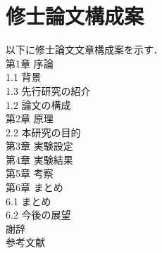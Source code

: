 \documentclass[11pt,a4paper]{jarticle}
\begin{document}
\section{修士論文構成案}
以下に修士論文文章構成案を示す．\\
\noindent
第1章 序論\\
\hspace{0.5cm}1.1 背景\\
\hspace{0.5cm}1.3 先行研究の紹介\\
\hspace{0.5cm}1.2 論文の構成\\
第2章 原理\\
\hspace{0.5cm}2.2 本研究の目的\\
第3章 実験設定\\
第4章 実験結果\\
第5章 考察\\
第6章 まとめ\\
\hspace{0.5cm}6.1 まとめ\\
\hspace{0.5cm}6.2 今後の展望\\
謝辞\\
参考文献\\




\end{document}
